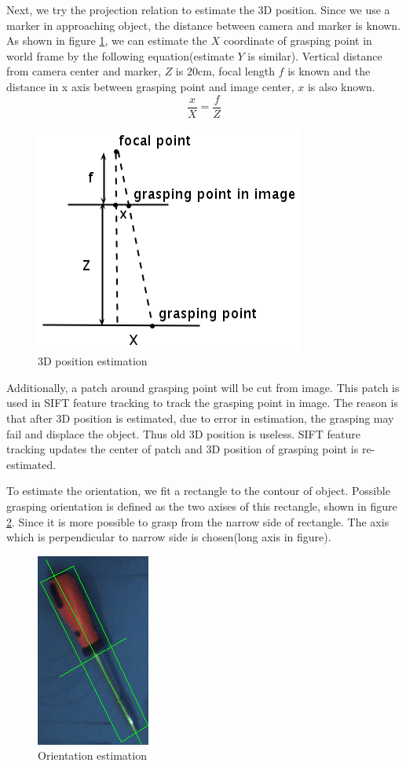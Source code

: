 \documentclass[a4paper, 10pt, conference]{ieeeconf}      %
\begin{document}
Next, we try the projection relation to estimate the 3D position. Since we use a marker in approaching object, the distance between camera and  marker is known. As shown in figure \ref{fig:pos}, we can estimate the $X$ coordinate of grasping point in world frame by the following equation(estimate $Y$ is similar). Vertical distance from camera center and marker, $Z$ is 20cm, focal length $f$ is known and the distance in x axis between grasping point and image center, $x$ is also known. 
$$\frac{x}{X}=\frac{f}{Z}$$
\begin{figure}[!htb]
	\centering
	\includegraphics[width=.6\linewidth]{pos}
	\caption{\label{fig:pos}3D position estimation}
\end{figure}

Additionally, a patch around grasping point will be cut from image. This patch is used in SIFT\cite{c10} feature tracking to track the grasping point in image. The reason is that after 3D position is estimated, due to error in estimation, the grasping may fail and displace the object. Thus old 3D position is useless. SIFT feature tracking updates the center of patch and 3D position of grasping point is re-estimated.

To estimate the orientation, we fit a rectangle to the contour of object. Possible grasping orientation is defined as the two axises of this rectangle, shown in figure \ref{fig:ori}. Since it is more possible to grasp from the narrow side of rectangle. The axis which is perpendicular to narrow side is chosen(long axis in figure).
\begin{figure}[!htb]
	\centering
	\includegraphics[width=.3\linewidth]{ori}
	\caption{\label{fig:ori}Orientation estimation}
\end{figure}
\end{document}
